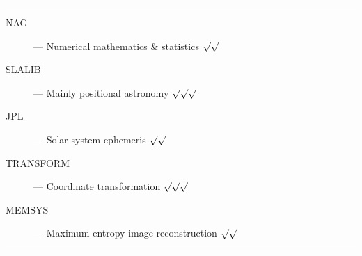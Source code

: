 \rule{\textwidth}{0.5mm}
\begin{description}
\begin{description}
\item [NAG] --- Numerical mathematics \& statistics \hfill $\surd\surd$
\item [SLALIB] --- Mainly positional astronomy \hfill $\surd\surd\surd$
\item [JPL] --- Solar system ephemeris \hfill $\surd\surd$
\item [TRANSFORM] --- Coordinate transformation \hfill $\surd\surd\surd$
\item [MEMSYS] --- Maximum entropy image reconstruction \hfill $\surd\surd$
\end{description}
\end{description}
\rule{\textwidth}{0.5mm}

